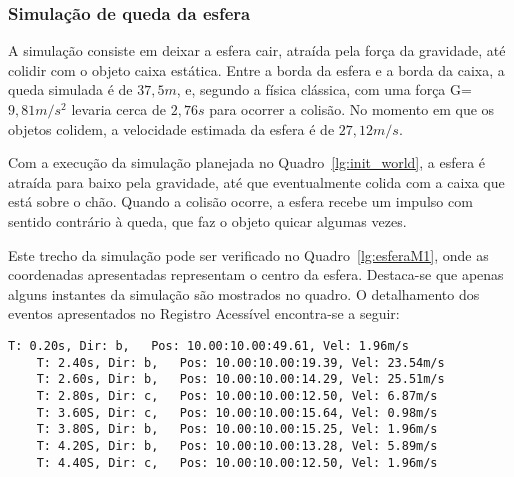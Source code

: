 \documentclass[12pt]{article}
\begin{document}
\subsubsection{Simulação de queda da esfera}

A simulação consiste em deixar a esfera cair, atraída pela força da gravidade, até colidir com o objeto caixa estática. Entre a borda da esfera e a borda da caixa, a queda simulada é de $37,5m$, e, segundo a física clássica, com uma força G=$9,81 m/s^{2}$ levaria cerca de $2,76s$ para ocorrer a colisão. No momento em que os objetos colidem, a velocidade estimada da esfera é de $27,12m/s$.

Com a execução da simulação planejada no Quadro~\ref{lg:init_world}, a esfera é atraída para baixo pela gravidade, até que eventualmente colida com a caixa que está sobre o chão. Quando a colisão ocorre, a esfera recebe um impulso com sentido contrário à queda, que faz o objeto quicar algumas vezes. 

Este trecho da simulação pode ser verificado no Quadro~\ref{lg:esferaM1}, onde as coordenadas apresentadas representam o centro da esfera. Destaca-se que apenas alguns instantes da simulação são mostrados no quadro. O detalhamento dos eventos apresentados no Registro Acessível encontra-se a seguir:

\begin{lstlisting}[frame=single,caption=Registro Acessível: Queda da esfera. \label{lg:esferaM1}]
	T: 0.20s, Dir: b, 	Pos: 10.00:10.00:49.61, Vel: 1.96m/s	
	T: 2.40s, Dir: b, 	Pos: 10.00:10.00:19.39, Vel: 23.54m/s
	T: 2.60s, Dir: b, 	Pos: 10.00:10.00:14.29, Vel: 25.51m/s
	T: 2.80s, Dir: c, 	Pos: 10.00:10.00:12.50, Vel: 6.87m/s
	T: 3.60S, Dir: c, 	Pos: 10.00:10.00:15.64, Vel: 0.98m/s
	T: 3.80S, Dir: b, 	Pos: 10.00:10.00:15.25, Vel: 1.96m/s
	T: 4.20S, Dir: b, 	Pos: 10.00:10.00:13.28, Vel: 5.89m/s
	T: 4.40S, Dir: c, 	Pos: 10.00:10.00:12.50, Vel: 1.96m/s
\end{lstlisting}
\end{document}
